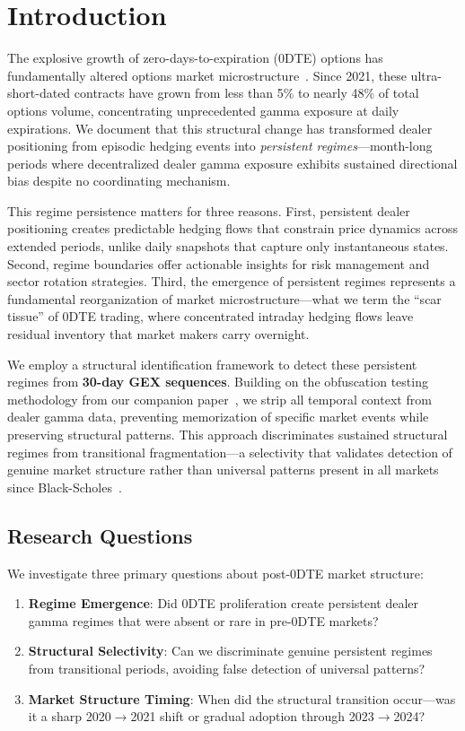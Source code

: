 \section{Introduction}

The explosive growth of zero-days-to-expiration (0DTE) options has fundamentally altered options market microstructure~\citep{cboe2024zero,dim2025zero}. Since 2021, these ultra-short-dated contracts have grown from less than 5\% to nearly 48\% of total options volume, concentrating unprecedented gamma exposure at daily expirations. We document that this structural change has transformed dealer positioning from episodic hedging events into \textit{persistent regimes}---month-long periods where decentralized dealer gamma exposure exhibits sustained directional bias despite no coordinating mechanism.

This regime persistence matters for three reasons. First, persistent dealer positioning creates predictable hedging flows that constrain price dynamics across extended periods, unlike daily snapshots that capture only instantaneous states. Second, regime boundaries offer actionable insights for risk management and sector rotation strategies. Third, the emergence of persistent regimes represents a fundamental reorganization of market microstructure---what we term the ``scar tissue'' of 0DTE trading, where concentrated intraday hedging flows leave residual inventory that market makers carry overnight.

We employ a structural identification framework to detect these persistent regimes from \textbf{30-day GEX sequences}. Building on the obfuscation testing methodology from our companion paper~\citep{regan2025obfuscation}, we strip all temporal context from dealer gamma data, preventing memorization of specific market events while preserving structural patterns. This approach discriminates sustained structural regimes from transitional fragmentation---a selectivity that validates detection of genuine market structure rather than universal patterns present in all markets since Black-Scholes~\citep{black1973pricing}.

\subsection{Research Questions}

We investigate three primary questions about post-0DTE market structure:

\begin{enumerate}
\item \textbf{Regime Emergence}: Did 0DTE proliferation create persistent dealer gamma regimes that were absent or rare in pre-0DTE markets?
\item \textbf{Structural Selectivity}: Can we discriminate genuine persistent regimes from transitional periods, avoiding false detection of universal patterns?
\item \textbf{Market Structure Timing}: When did the structural transition occur---was it a sharp 2020$\rightarrow$2021 shift or gradual adoption through 2023$\rightarrow$2024?
\end{enumerate}

